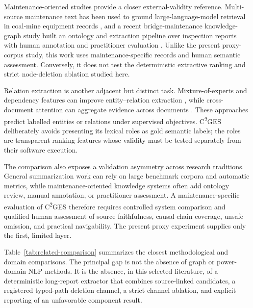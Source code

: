 \documentclass[applsci,article,submit,moreauthors]{Definitions/mdpi}
\newcommand{\cges}{C\textsuperscript{2}GES}
\begin{document}
Maintenance-oriented studies provide a closer external-validity reference. Multi-source maintenance text has been used to ground large-language-model retrieval in coal-mine equipment records \cite{cao2024coalmaintenance}, and a recent bridge-maintenance knowledge-graph study built an ontology and extraction pipeline over inspection reports with human annotation and practitioner evaluation \cite{zgg2026bridge}. Unlike the present proxy-corpus study, this work uses maintenance-specific records and human semantic assessment. Conversely, it does not test the deterministic extractive ranking and strict node-deletion ablation studied here.

Relation extraction is another adjacent but distinct task. Mixture-of-experts and dependency features can improve entity--relation extraction \cite{li2025moere}, while cross-document attention can aggregate evidence across documents \cite{she2025clear}. These approaches predict labelled entities or relations under supervised objectives. \cges{} deliberately avoids presenting its lexical roles as gold semantic labels; the roles are transparent ranking features whose validity must be tested separately from their software execution.

The comparison also exposes a validation asymmetry across research traditions. General summarization work can rely on large benchmark corpora and automatic metrics, while maintenance-oriented knowledge systems often add ontology review, manual annotation, or practitioner assessment. A maintenance-specific evaluation of \cges{} therefore requires controlled system comparison and qualified human assessment of source faithfulness, causal-chain coverage, unsafe omission, and practical navigability. The present proxy experiment supplies only the first, limited layer.

Table~\ref{tab:related-comparison} summarizes the closest methodological and domain comparisons. The principal gap is not the absence of graph or power-domain NLP methods. It is the absence, in this selected literature, of a deterministic long-report extractor that combines source-linked candidates, a registered typed-path deletion channel, a strict channel ablation, and explicit reporting of an unfavorable component result.
\end{document}
